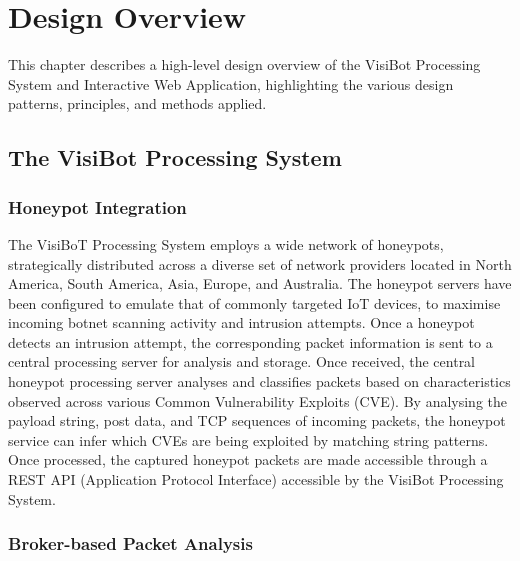 
\chapter{Design Overview}

This chapter describes a high-level design overview of the VisiBot Processing System and Interactive Web Application, highlighting the various design patterns, principles, and methods applied. 

\section{The VisiBot Processing System}

\subsection{Honeypot Integration}

The VisiBoT Processing System employs a wide network of honeypots, strategically distributed across a diverse set of network providers located in North America, South America, Asia, Europe, and Australia. The honeypot servers have been configured to emulate that of commonly targeted IoT devices, to maximise incoming botnet scanning activity and intrusion attempts. Once a honeypot detects an intrusion attempt, the corresponding packet information is sent to a central processing server for analysis and storage. Once received, the central honeypot processing server analyses and classifies packets based on characteristics observed across various Common Vulnerability Exploits (CVE). By analysing the payload string, post data, and TCP sequences of incoming packets, the honeypot service can infer which CVEs are being exploited by matching string patterns. Once processed, the captured honeypot packets are made accessible through a REST API (Application Protocol Interface) accessible by the VisiBot Processing System.

\subsection{Broker-based Packet Analysis}

